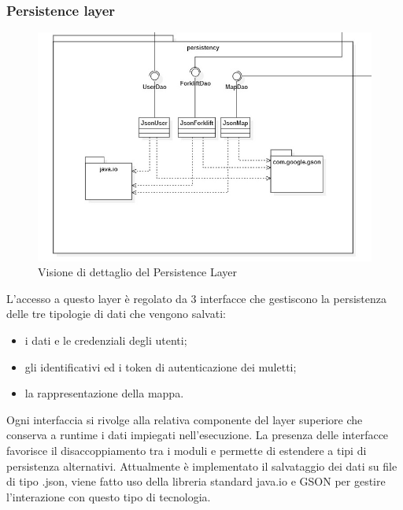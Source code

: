 \subsubsection{Persistence layer}

\begin{figure}[H]
	\centering
	\includegraphics[scale=0.50]{res/diagrams/server/server_persistency.jpg}
	\caption{Visione di dettaglio del Persistence Layer}
\end{figure}

L'accesso a questo layer è regolato da 3 interfacce che gestiscono la persistenza delle tre tipologie di dati che vengono salvati:
\begin{itemize}
	\item i dati e le credenziali degli utenti;
	\item gli identificativi ed i token di autenticazione dei muletti;
	\item la rappresentazione della mappa.
\end{itemize}

Ogni interfaccia si rivolge alla relativa componente del layer superiore che conserva a runtime i dati impiegati nell'esecuzione. La presenza delle interfacce favorisce il disaccoppiamento tra i moduli e permette di estendere a tipi di persistenza alternativi. Attualmente è implementato il salvataggio dei dati su file di tipo .json, viene fatto uso della libreria standard java.io e GSON per gestire l'interazione con questo tipo di tecnologia.


\pagebreak
